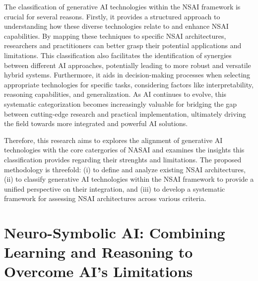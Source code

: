 \documentclass[12pt]{article}
\begin{document}
\vspace*{0.5cm}

The classification of generative AI technologies within the NSAI framework is crucial for several reasons. Firstly, it provides a structured approach to understanding how these diverse technologies relate to and enhance NSAI capabilities. By mapping these techniques to specific NSAI architectures, researchers and practitioners can better grasp their potential applications and limitations. This classification also facilitates the identification of synergies between different AI approaches, potentially leading to more robust and versatile hybrid systems. Furthermore, it aids in decision-making processes when selecting appropriate technologies for specific tasks, considering factors like interpretability, reasoning capabilities, and generalization. As AI continues to evolve, this systematic categorization becomes increasingly valuable for bridging the gap between cutting-edge research and practical implementation, ultimately driving the field towards more integrated and powerful AI solutions.

\vspace*{0.5cm}

Therefore, this research aims to explores the alignment of generative AI technologies with the core catergories of NASAI and examines the insights this classification provides regarding their strenghts and limitations. The proposed methodology is threefold: (i) to define and analyze existing NSAI architectures, (ii) to classify generative AI technologies within the NSAI framework to provide a unified perspective on their integration, and (iii) to develop a systematic framework for assessing NSAI architectures across various criteria.

\section{Neuro-Symbolic AI: Combining Learning and Reasoning to Overcome AI's Limitations}
\end{document}

